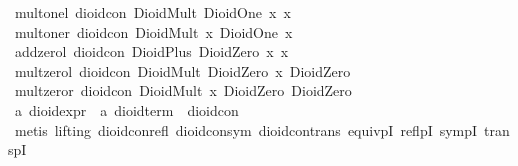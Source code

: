 \begin{isabellebody}
{}\ mult{}onel{}\ {}dioid{}con\ {}DioidMult\ DioidOne\ x{}\ x{}\isanewline
{}\ mult{}oner{}\ {}dioid{}con\ {}DioidMult\ x\ DioidOne{}\ x{}\isanewline
{}\ add{}zerol{}\ {}dioid{}con\ {}DioidPlus\ DioidZero\ x{}\ x{}\isanewline
{}\ mult{}zerol{}\ {}dioid{}con\ {}DioidMult\ DioidZero\ x{}\ DioidZero{}\isanewline
{}\ mult{}zeror{}\ {}dioid{}con\ {}DioidMult\ x\ DioidZero{}\ DioidZero{}\isanewline
\isanewline
{}\isamarkupfalse%
\ {}a\ dioid{}expr\ {}\ {}{}a\ dioid{}term{}\ {}\ dioid{}con\isanewline
%
\isadelimproof
\ \ %
\endisadelimproof
%
\isatagproof
{}\isamarkupfalse%
\ {}metis\ {}lifting{}\ dioid{}con{}refl\ dioid{}con{}sym\ dioid{}con{}trans\ equivpI\ reflpI\ sympI\ transpI{}%

\end{isabellebody}
